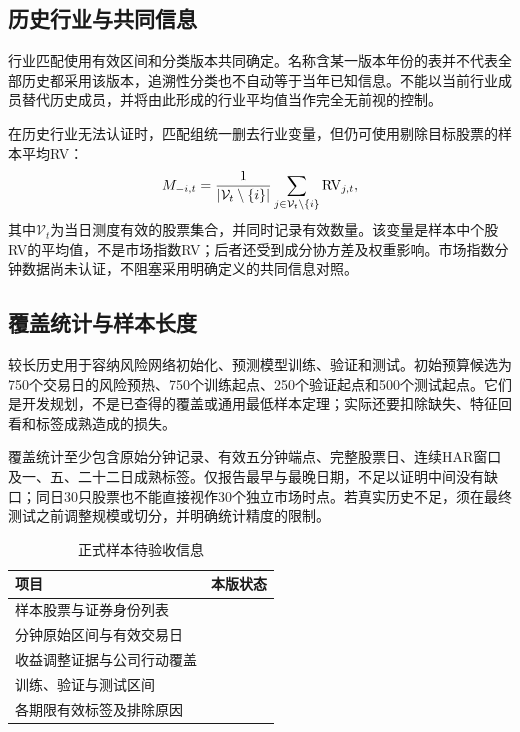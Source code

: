 \subsection{历史行业与共同信息}
行业匹配使用有效区间和分类版本共同确定。名称含某一版本年份的表并不代表全部历史都采用该版本，追溯性分类也不自动等于当年已知信息。不能以当前行业成员替代历史成员，并将由此形成的行业平均值当作完全无前视的控制。

在历史行业无法认证时，匹配组统一删去行业变量，但仍可使用剔除目标股票的样本平均RV：
\begin{equation}\label{eq:market_control}
M_{-i,t}=\frac{1}{|\mathcal V_t\setminus\{i\}|}
\sum_{j\in\mathcal V_t\setminus\{i\}}\operatorname{RV}_{j,t},
\end{equation}
其中$\mathcal V_t$为当日测度有效的股票集合，并同时记录有效数量。该变量是样本中个股RV的平均值，不是市场指数RV；后者还受到成分协方差及权重影响。市场指数分钟数据尚未认证，不阻塞采用明确定义的共同信息对照。

\subsection{覆盖统计与样本长度}
较长历史用于容纳风险网络初始化、预测模型训练、验证和测试。初始预算候选为750个交易日的风险预热、750个训练起点、250个验证起点和500个测试起点。它们是开发规划，不是已查得的覆盖或通用最低样本定理；实际还要扣除缺失、特征回看和标签成熟造成的损失。

覆盖统计至少包含原始分钟记录、有效五分钟端点、完整股票日、连续HAR窗口及一、五、二十二日成熟标签。仅报告最早与最晚日期，不足以证明中间没有缺口；同日30只股票也不能直接视作30个独立市场时点。若真实历史不足，须在最终测试之前调整规模或切分，并明确统计精度的限制。

\begin{table}[htbp]\centering\small
\caption{正式样本待验收信息}\label{tab:sample_pending}
\begin{tabularx}{\textwidth}{p{}Y}
\toprule 项目 & 本版状态\\\midrule
样本股票与证券身份列表 & \\
分钟原始区间与有效交易日 & \\
收益调整证据与公司行动覆盖 & \\
训练、验证与测试区间 & \\
各期限有效标签及排除原因 & \\\bottomrule
\end{tabularx}
\end{table}

